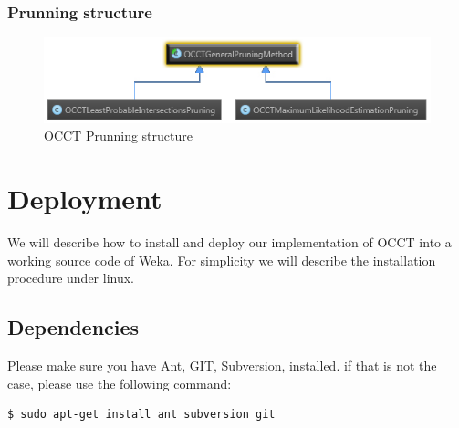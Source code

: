 \documentclass[a4paper,12pt]{article}
\begin{document}
\begin{spacing}{1.5}
\subsubsection{Prunning structure}
\begin{figure}[!h]
    \centering
\includegraphics[width=1\textwidth]{Figures/OCCTPruneStructure}
    \caption{OCCT Prunning structure}
    \label{fig:prunestr}
\end{figure}



\clearpage
\section{Deployment}
We will describe how to install and deploy our implementation of OCCT into a working source code of Weka.
For simplicity we will describe the installation procedure under linux.

\subsection{Dependencies}
Please make sure you have Ant, GIT, Subversion, installed.
if that is not the case, please use the following command:
\begin{lstlisting}[language=bash,frame=none,backgroundcolor=\color{anti-flashwhite}]
  $ sudo apt-get install ant subversion git
\end{lstlisting}


\end{spacing}
\end{document}
